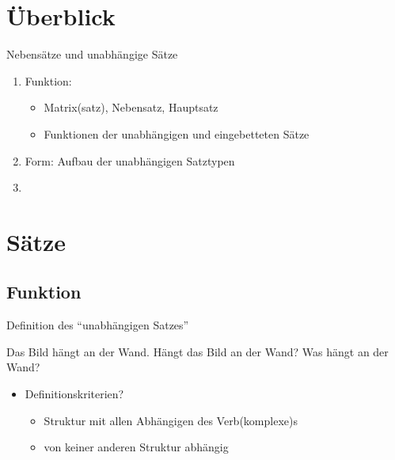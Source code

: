 

\section{Überblick}

\begin{frame}
  {Nebensätze und unabhängige Sätze}
  \pause
  \begin{enumerate}[<+->]
    \item \alert{Funktion}:
    \begin{itemize}[<+->]
      \item Matrix(satz), Nebensatz, Hauptsatz
      \item Funktionen der unabhängigen und eingebetteten Sätze 
    \end{itemize}
    \Zeile
    \item \alert{Form}: Aufbau der unabhängigen Satztypen
      \Zeile
    \item \citet{Schaefer2018b}
  \end{enumerate}
\end{frame}




\section{Sätze}

\subsection{Funktion}

\begin{frame}
  {Definition des "`unabhängigen Satzes"'}
  \pause
  \begin{exe}
    \ex Das Bild hängt an der Wand.
    \pause
    \ex Hängt das Bild an der Wand?
    \pause
    \ex Was hängt an der Wand?
  \end{exe}
  \pause
  \begin{itemize}[<+->]
    \item Definitionskriterien?
      \begin{itemize}[<+->]
        \item Struktur mit \alert{allen Abhängigen} des Verb(komplexe)s
        \item \alert{von keiner anderen Struktur abhängig}
      \end{itemize}
  \end{itemize}
\end{frame}

